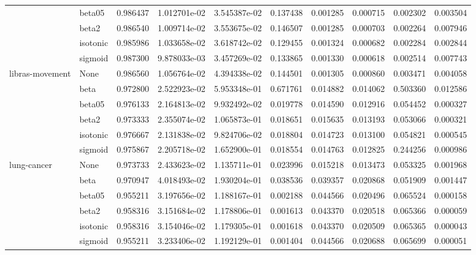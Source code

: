 \begin{tabular}{llrrrrrrrr}
        & beta05 &  0.986437 &  1.012701e-02 &  3.545387e-02 &   0.137438 &  0.001285 &  0.000715 &  0.002302 &  0.003504 \\
        & beta2 &  0.986540 &  1.009714e-02 &  3.553675e-02 &   0.146507 &  0.001285 &  0.000703 &  0.002264 &  0.007946 \\
        & isotonic &  0.985986 &  1.033658e-02 &  3.618742e-02 &   0.129455 &  0.001324 &  0.000682 &  0.002284 &  0.002844 \\
        & sigmoid &  0.987300 &  9.878033e-03 &  3.457269e-02 &   0.133865 &  0.001330 &  0.000618 &  0.002514 &  0.007743 \\
libras-movement & None &  0.986560 &  1.056764e-02 &  4.394338e-02 &   0.144501 &  0.001305 &  0.000860 &  0.003471 &  0.004058 \\
        & beta &  0.972800 &  2.522923e-02 &  5.953348e-01 &   0.671761 &  0.014882 &  0.014062 &  0.503360 &  0.012586 \\
        & beta05 &  0.976133 &  2.164813e-02 &  9.932492e-02 &   0.019778 &  0.014590 &  0.012916 &  0.054452 &  0.000327 \\
        & beta2 &  0.973333 &  2.355074e-02 &  1.065873e-01 &   0.018651 &  0.015635 &  0.013193 &  0.053066 &  0.000321 \\
        & isotonic &  0.976667 &  2.131838e-02 &  9.824706e-02 &   0.018804 &  0.014723 &  0.013100 &  0.054821 &  0.000545 \\
        & sigmoid &  0.975867 &  2.205718e-02 &  1.652900e-01 &   0.018554 &  0.014763 &  0.012825 &  0.244256 &  0.000986 \\
lung-cancer & None &  0.973733 &  2.433623e-02 &  1.135711e-01 &   0.023996 &  0.015218 &  0.013473 &  0.053325 &  0.001968 \\
        & beta &  0.970947 &  4.018493e-02 &  1.930204e-01 &   0.038536 &  0.039357 &  0.020868 &  0.051909 &  0.001447 \\
        & beta05 &  0.955211 &  3.197656e-02 &  1.188167e-01 &   0.002188 &  0.044566 &  0.020496 &  0.065524 &  0.000158 \\
        & beta2 &  0.958316 &  3.151684e-02 &  1.178806e-01 &   0.001613 &  0.043370 &  0.020518 &  0.065366 &  0.000059 \\
        & isotonic &  0.958316 &  3.154046e-02 &  1.179305e-01 &   0.001618 &  0.043370 &  0.020509 &  0.065365 &  0.000043 \\
        & sigmoid &  0.955211 &  3.233406e-02 &  1.192129e-01 &   0.001404 &  0.044566 &  0.020688 &  0.065699 &  0.000051 \\

\end{tabular}
